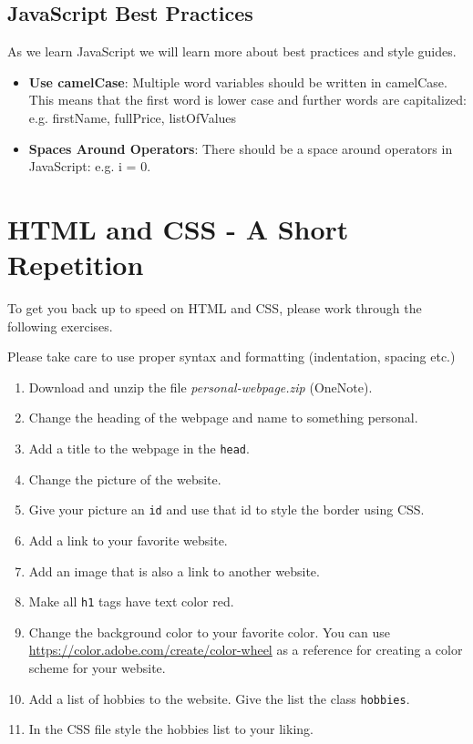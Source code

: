 \documentclass[11pt,a4paper]{report}
\newcommand{\bfb}[1]{{\bf \color{blue} #1}}
\begin{document}
\subsection{JavaScript Best Practices}

As we learn JavaScript we will learn more about best practices and style guides. 

\begin{itemize}
\item \bfb{Use camelCase}: Multiple word variables should be written in camelCase.  This means that the first word is lower case and further words are capitalized: e.g. firstName, fullPrice, listOfValues

\item \bfb{Spaces Around Operators}: There should be a space around operators in JavaScript: e.g. i = 0.
\end{itemize}


\newpage

\section{HTML and CSS - A Short Repetition}

To get you back up to speed on HTML and CSS, please work through the following exercises.

Please take care to use proper syntax and formatting (indentation, spacing etc.)

\begin{ex}
\begin{enumerate}
\item Download and unzip the file \emph{personal-webpage.zip} (OneNote). 
\item Change the heading of the webpage and name to something personal.
\item Add a title to the webpage in the \verb|head|.
\item Change the picture of the website.
\item Give your picture an \verb|id| and use that id to style the border using CSS.
\item Add a link to your favorite website.
\item Add an image that is also a link to another website.
\item Make all \verb|h1| tags have text color red.
\item Change the background color to your favorite color. You can use \url{https://color.adobe.com/create/color-wheel} as a reference for creating a color scheme for your website.
\item Add a list of hobbies to the website.  Give the list the class \verb|hobbies|.
\item In the CSS file style the hobbies list to your liking.
\end{enumerate}
 
\end{ex}
\end{document}
